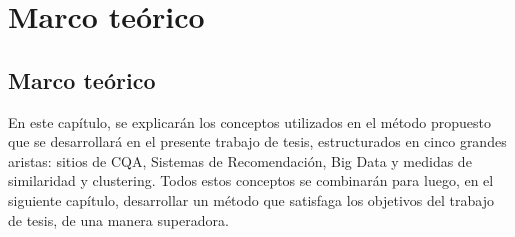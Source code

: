 \chapter*{Marco teórico}\label{ch:marcoteorico}
\section{Marco teórico}
En este capítulo, se explicarán los conceptos utilizados en el método propuesto que se desarrollará en el presente trabajo de tesis, estructurados en cinco grandes aristas: sitios de CQA, Sistemas de Recomendación, Big Data y medidas de similaridad y clustering. Todos estos conceptos se combinarán para luego, en el siguiente capítulo, desarrollar un método que satisfaga los objetivos del trabajo de tesis, de una manera superadora.








